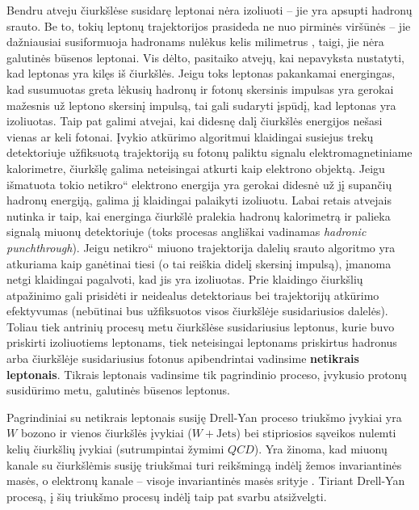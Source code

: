 \documentclass[a4paper, 12pt, oneside]{article}
\newcommand{\WJets}{W\! +\!\mathrm{Jets}}
\newcommand{\ltq}[1]{{\quotedblbase{}#1\textquotedblleft{}}}
\newcommand{\QCD}{QC\! D}
\newlength\q
\begin{document}
Bendru atveju čiurkšlėse susidarę leptonai nėra izoliuoti -- jie yra apsupti hadronų srauto.
Be to, tokių leptonų trajektorijos prasideda ne nuo pirminės viršūnės -- jie dažniausiai susiformuoja hadronams nulėkus
kelis milimetrus \cite{LeptonJets}, taigi, jie nėra galutinės būsenos leptonai.
Vis dėlto, pasitaiko atvejų, kai nepavyksta nustatyti, kad leptonas yra kilęs iš čiurkšlės.
Jeigu toks leptonas pakankamai energingas, kad susumuotas greta lėkusių hadronų ir fotonų skersinis impulsas yra gerokai
mažesnis už leptono skersinį impulsą, tai gali sudaryti įspūdį, kad leptonas yra izoliuotas.
Taip pat galimi atvejai, kai didesnę dalį čiurkšlės energijos nešasi vienas ar keli fotonai.
Įvykio atkūrimo algoritmui klaidingai susiejus trekų detektoriuje užfiksuotą trajektoriją su fotonų paliktu signalu
elektromagnetiniame kalorimetre, čiurkšlę galima neteisingai atkurti kaip elektrono objektą.
Jeigu išmatuota tokio \ltq{netikro} elektrono energija yra gerokai didesnė už jį supančių hadronų energiją, galima jį
klaidingai palaikyti izoliuotu.
Labai retais atvejais nutinka ir taip, kai energinga čiurkšlė pralekia hadronų kalorimetrą ir palieka signalą miuonų
detektoriuje (toks procesas angliškai vadinamas \textit{hadronic punchthrough}).
Jeigu \ltq{netikro} miuono trajektorija dalelių srauto algoritmo yra atkuriama kaip ganėtinai tiesi (o tai reiškia
didelį skersinį impulsą), įmanoma netgi klaidingai pagalvoti, kad jis yra izoliuotas.
Prie klaidingo čiurkšlių atpažinimo gali prisidėti ir neidealus detektoriaus bei trajektorijų atkūrimo efektyvumas
(nebūtinai bus užfiksuotos visos čiurkšlėje susidariusios dalelės).
Toliau tiek antrinių procesų metu čiurkšlėse susidariusius leptonus, kurie buvo priskirti izoliuotiems leptonams, tiek
neteisingai leptonams priskirtus hadronus arba čiurkšlėje susidariusius fotonus apibendrintai vadinsime \textbf{netikrais leptonais}.
Tikrais leptonais vadinsime tik pagrindinio proceso, įvykusio protonų susidūrimo metu, galutinės būsenos leptonus.

Pagrindiniai su netikrais leptonais susiję Drell-Yan proceso triukšmo įvykiai yra $W$ bozono ir vienos čiurkšlės
įvykiai ($\WJets$) bei stipriosios sąveikos nulemti kelių čiurkšlių įvykiai (sutrumpintai žymimi $\QCD$).
Yra žinoma, kad miuonų kanale su čiurkšlėmis susiję triukšmai turi reikšmingą indėlį žemos invariantinės masės,
o elektronų kanale -- visoje invariantinės masės srityje \cite{DY_CMS2011, DY_CMS2013, DY_CMS2015, DY_CMS2019}.
Tiriant Drell-Yan procesą, į šių triukšmo procesų indėlį taip pat svarbu atsižvelgti.
\end{document}
